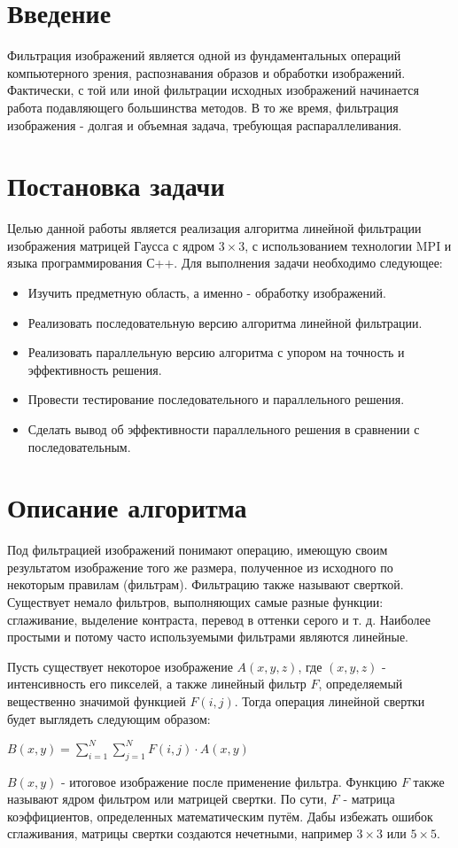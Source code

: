 \documentclass[14pt]{article}
\begin{document}
\section{Введение}
Фильтрация изображений является одной из фундаментальных операций компьютерного зрения, распознавания образов и обработки изображений. Фактически, с той или иной фильтрации исходных изображений начинается работа подавляющего большинства методов. В то же время, фильтрация изображения - долгая и объемная задача, требующая распараллеливания.

\section{Постановка задачи}
Целью данной работы является реализация алгоритма линейной фильтрации изображения матрицей Гаусса с ядром $3 \times 3$, с использованием технологии MPI и языка программирования С++. Для выполнения задачи необходимо следующее:
\begin{itemize}
    \item Изучить предметную область, а именно - обработку изображений.
    \item Реализовать последовательную версию алгоритма линейной фильтрации.
    \item Реализовать параллельную версию алгоритма с упором на точность и эффективность решения.
    \item Провести тестирование последовательного и параллельного решения.
    \item Сделать вывод об эффективности параллельного решения в сравнении с последовательным.
\end{itemize}
\newpage
\section{Описание алгоритма}
Под фильтрацией изображений понимают операцию, имеющую своим результатом
изображение того же размера, полученное из исходного по некоторым правилам (фильтрам). Фильтрацию также называют сверткой. Существует немало фильтров, выполняющих самые разные функции: сглаживание, выделение контраста, перевод в оттенки серого и т. д. Наиболее простыми и потому часто используемыми фильтрами являются линейные.

Пусть существует некоторое изображение $A(x, y, z)$, где $(x, y, z)$ - интенсивность его пикселей, а также линейный фильтр $F$, определяемый вещественно значимой функцией $F(i, j)$. Тогда операция линейной свертки будет выглядеть следующим образом:
\begin{center}
    $B(x, y) = \sum_{i = 1}^{N}\sum_{j = 1}^{N}F(i, j) \cdot A(x, y)$
\end{center}
$B(x, y)$ - итоговое изображение после применение фильтра.
Функцию $F$ также называют ядром фильтром или матрицей свертки. По сути, $F$ - матрица коэффициентов, определенных математическим путём. Дабы избежать ошибок сглаживания, матрицы свертки создаются нечетными, например $3\times 3$ или $5\times 5$. 
\end{document}
